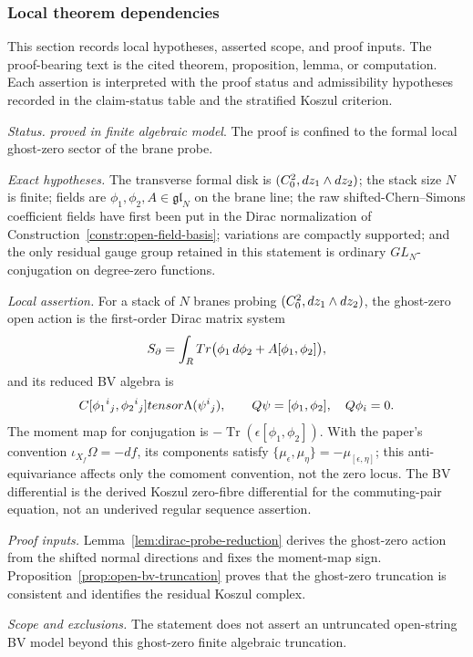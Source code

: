 \subsubsection{Local theorem dependencies}\label{ssec:theorem-lanes}
This section records local hypotheses, asserted scope, and
proof inputs.  The proof-bearing text is the cited theorem,
proposition, lemma, or computation.  Each assertion is interpreted with
the proof status and admissibility hypotheses recorded in the claim-status table
and the stratified Koszul criterion.

\begin{stmt}\label{thm:lane-dirac-probe}
  \emph{Status.} \emph{proved in finite algebraic model}.  The proof is
  confined to the formal local ghost-zero sector of the brane probe.

  \emph{Exact hypotheses.} The transverse formal disk is
  \((C^2_0,dz_1\wedge dz_2)\); the stack size \(N\) is finite;
  fields are \(\phi_1,\phi_2,A\in\mathfrak{gl}_N\) on the brane line;
  the raw shifted-Chern--Simons coefficient fields have first been put in
  the Dirac normalization of
  Construction~\ref{constr:open-field-basis}; variations are compactly
  supported; and the only residual gauge group retained in this statement is
  ordinary \(GL_N\)-conjugation on degree-zero functions.

  \emph{Local assertion.} For a stack of \(N\) branes probing
  \((C^2_0,dz_1\wedge dz_2)\), the ghost-zero open action is
  the first-order Dirac matrix system
  \[
    S_\partial
    =\int_{R}Tr
      \bigl(\phi_1\,d\phi_2+A[\phi_1,\phi_2]\bigr),
  \]
  and its reduced BV algebra is
  \[
    C[\phi_1{}^i{}_j,\phi_2{}^i{}_j]tensor
    \Lambda(\psi^i{}_j),
    \qquad
    Q\psi=[\phi_1,\phi_2],\quad Q\phi_i=0.
  \]
  The moment map for conjugation is
  \(-\operatorname{Tr}(\epsilon[\phi_1,\phi_2])\).  With the paper's
  convention \(\iota_{X_f}\Omega=-df\), its components satisfy
  \(\{\mu_\epsilon,\mu_\eta\}=-\mu_{[\epsilon,\eta]}\); this
  anti-equivariance affects only the comoment convention, not the zero
  locus.  The BV differential is the derived Koszul zero-fibre
  differential for the commuting-pair equation, not an underived regular
  sequence assertion.

  \emph{Proof inputs.}
  Lemma~\ref{lem:dirac-probe-reduction} derives the ghost-zero action
  from the shifted normal directions and fixes the moment-map sign.
  Proposition~\ref{prop:open-bv-truncation} proves that the ghost-zero
  truncation is consistent and identifies the residual Koszul complex.

  \emph{Scope and exclusions.} The statement does not assert an untruncated open-string
  BV model beyond this ghost-zero finite algebraic truncation.
\end{stmt}

